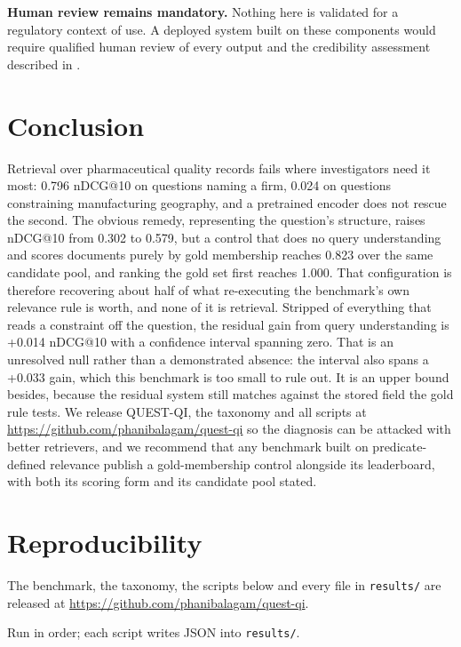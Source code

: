 \documentclass[runningheads]{llncs}
\begin{document}
\textbf{Human review remains mandatory.} Nothing here is validated for a regulatory context of use. A deployed system built on these components would require qualified human review of every output and the credibility assessment described in \cite{fda_ai_credibility}.


\section{Conclusion}
Retrieval over pharmaceutical quality records fails where investigators need it most: 0.796 nDCG@10 on questions naming a firm, 0.024 on questions constraining manufacturing geography, and a pretrained encoder does not rescue the second. The obvious remedy, representing the question's structure, raises nDCG@10 from 0.302 to 0.579, but a control that does no query understanding and scores documents purely by gold membership reaches 0.823 over the same candidate pool, and ranking the gold set first reaches 1.000. That configuration is therefore recovering about half of what re-executing the benchmark's own relevance rule is worth, and none of it is retrieval. Stripped of everything that reads a constraint off the question, the residual gain from query understanding is +0.014 nDCG@10 with a confidence interval spanning zero. That is an unresolved null rather than a demonstrated absence: the interval also spans a +0.033 gain, which this benchmark is too small to rule out. It is an upper bound besides, because the residual system still matches against the stored field the gold rule tests. We release QUEST-QI, the taxonomy and all scripts at \url{https://github.com/phanibalagam/quest-qi} so the diagnosis can be attacked with better retrievers, and we recommend that any benchmark built on predicate-defined relevance publish a gold-membership control alongside its leaderboard, with both its scoring form and its candidate pool stated.


\section*{Reproducibility}
The benchmark, the taxonomy, the scripts below and every file in \texttt{results/} are released at \url{https://github.com/phanibalagam/quest-qi}.

Run in order; each script writes JSON into \texttt{results/}.
\end{document}
